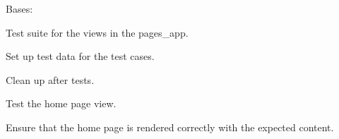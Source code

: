 \documentclass[letterpaper,10pt,english]{sphinxmanual}
\begin{document}
\begin{fulllineitems}
\label{\detokenize{pages_app.tests:pages_app.tests.test_views.ViewTests}}
\pysigstartsignatures
\pysiglinewithargsret
{}
{}
{}
\pysigstopsignatures
\sphinxAtStartPar
Bases: 

\sphinxAtStartPar
Test suite for the views in the pages\_app.

\begin{fulllineitems}
\label{\detokenize{pages_app.tests:pages_app.tests.test_views.ViewTests.setUp}}
\pysigstartsignatures
\pysiglinewithargsret
{}
{}
{}
\pysigstopsignatures
\sphinxAtStartPar
Set up test data for the test cases.

\end{fulllineitems}


\begin{fulllineitems}
\label{\detokenize{pages_app.tests:pages_app.tests.test_views.ViewTests.tearDown}}
\pysigstartsignatures
\pysiglinewithargsret
{}
{}
{}
\pysigstopsignatures
\sphinxAtStartPar
Clean up after tests.

\end{fulllineitems}


\begin{fulllineitems}
\label{\detokenize{pages_app.tests:pages_app.tests.test_views.ViewTests.test_home_view}}
\pysigstartsignatures
\pysiglinewithargsret
{}
{}
{}
\pysigstopsignatures
\sphinxAtStartPar
Test the home page view.

\sphinxAtStartPar
Ensure that the home page is rendered correctly with the expected content.


\end{fulllineitems}
\end{fulllineitems}
\end{document}
